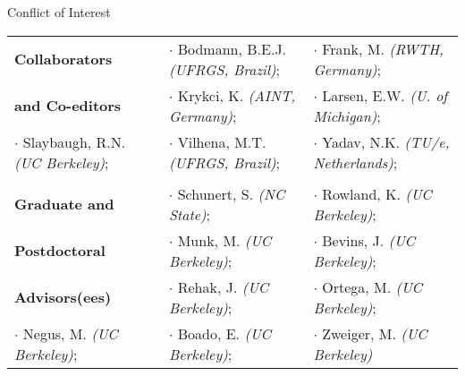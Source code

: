 \documentclass{resume3} %
\begin{document}
\vspace*{0.5em}
\begin{rSection}{Conflict of Interest}
\begin{tabular}{ @{} l @{\hspace{2ex}} l @{\hspace{3ex}} l }
\textbf{Collaborators}
& {\hspace{0em}}$\cdot$ Bodmann, B.E.J. \textit{(UFRGS, Brazil)};
& {\hspace*{0 em}}$\cdot$ Frank, M. \textit{(RWTH, Germany)};\\
\textbf{and Co-editors}
& {\hspace{0em}}$\cdot$ Krykci, K. \textit{(AINT, Germany)}; 
& {\hspace*{0 em}}$\cdot$ Larsen, E.W. \textit{(U. of Michigan)}; \\
{\hspace{0em}}$\cdot$ Slaybaugh, R.N. \textit{(UC Berkeley)}; 
& {\hspace*{0 em}}$\cdot$ Vilhena, M.T. \textit{(UFRGS, Brazil)}; 
& {\hspace{0em}}$\cdot$ Yadav, N.K. \textit{(TU/e, Netherlands)};\\
\quad \vspace{-5pt}\\
%
\textbf{Graduate and}
& {\hspace{0em}}$\cdot$ Schunert, S. \textit{(NC State)};
& {\hspace*{0 em}}$\cdot$ Rowland, K. \textit{(UC Berkeley)};\\
\textbf{Postdoctoral}
& {\hspace{0em}}$\cdot$ Munk, M. \textit{(UC Berkeley)}; 
& {\hspace*{0 em}}$\cdot$ Bevins, J. \textit{(UC Berkeley)}; \\
\textbf{Advisors(ees)}
& {\hspace{0em}}$\cdot$ Rehak, J. \textit{(UC Berkeley)}; & {\hspace{0em}}$\cdot$ Ortega, M. \textit{(UC Berkeley)}; \\
{\hspace{0em}}$\cdot$ Negus, M. \textit{(UC Berkeley)}; & {\hspace{0em}}$\cdot$ Boado, E. \textit{(UC Berkeley)}; & {\hspace{0em}}$\cdot$ Zweiger, M. \textit{(UC Berkeley)}
\end{tabular}
\end{rSection}

\end{document}
